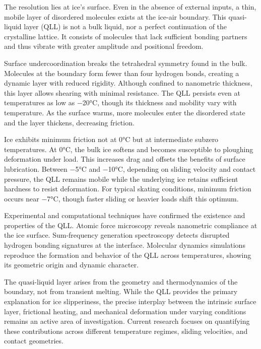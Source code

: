 The resolution lies at ice's surface. Even in the absence of external inputs, a thin, mobile layer of disordered molecules exists at the ice-air boundary. This quasi-liquid layer (QLL) is not a bulk liquid, nor a perfect continuation of the crystalline lattice. It consists of molecules that lack sufficient bonding partners and thus vibrate with greater amplitude and positional freedom.

Surface undercoordination breaks the tetrahedral symmetry found in the bulk. Molecules at the boundary form fewer than four hydrogen bonds, creating a dynamic layer with reduced rigidity. Although confined to nanometric thickness, this layer allows shearing with minimal resistance. The QLL persists even at temperatures as low as −20°C, though its thickness and mobility vary with temperature. As the surface warms, more molecules enter the disordered state and the layer thickens, decreasing friction.

Ice exhibits minimum friction not at 0°C but at intermediate subzero temperatures. At 0°C, the bulk ice softens and becomes susceptible to ploughing deformation under load. This increases drag and offsets the benefits of surface lubrication. Between −5°C and −10°C, depending on sliding velocity and contact pressure, the QLL remains mobile while the underlying ice retains sufficient hardness to resist deformation. For typical skating conditions, minimum friction occurs near −7°C, though faster sliding or heavier loads shift this optimum.

Experimental and computational techniques have confirmed the existence and properties of the QLL. Atomic force microscopy reveals nanometric compliance at the ice surface. Sum-frequency generation spectroscopy detects disrupted hydrogen bonding signatures at the interface. Molecular dynamics simulations reproduce the formation and behavior of the QLL across temperatures, showing its geometric origin and dynamic character.

The quasi-liquid layer arises from the geometry and thermodynamics of the boundary, not from transient melting. While the QLL provides the primary explanation for ice slipperiness, the precise interplay between the intrinsic surface layer, frictional heating, and mechanical deformation under varying conditions remains an active area of investigation. Current research focuses on quantifying these contributions across different temperature regimes, sliding velocities, and contact geometries.

\newpage

